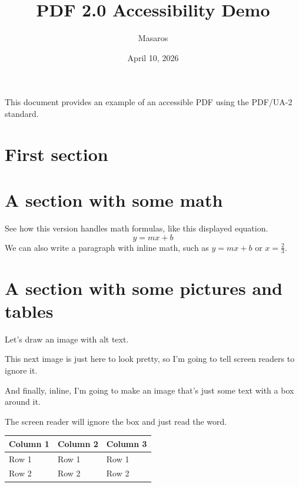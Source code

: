 \documentclass[10pt]{article}
\title{PDF 2.0 Accessibility Demo}
\author{Masaros}
\date{April 10, 2026}
\begin{document}
\maketitle
This document provides an example of an accessible PDF using the PDF/UA-2 standard.
\section{First section}
\lipsum[1]
\section{A section with some math}
See how this version handles math formulas, like this displayed equation.
\[
y=mx+b
\]
We can also write a paragraph with inline math, such as $y=mx+b$ or $x=\frac{2}{3}$.
\section{A section with some pictures and tables}
Let's draw an image with alt text.
\begin{center}
\end{center}
This next image is just here to look pretty, so I'm going to tell screen readers to ignore it.
\begin{center}
\end{center}
And finally, inline, I'm going to make an image that's just some text with a box around it.
The screen reader will ignore the box and just read the word.
\begin{center}
\begin{tabular}{lll}
Column 1&Column 2&Column 3\\\hline
Row 1&Row 1&Row 1\\
Row 2&Row 2&Row 2
\end{tabular}
\end{center}
\end{document}

